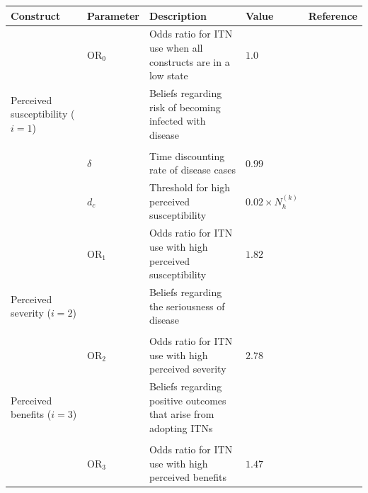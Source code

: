 \begin{table}[htp!]
    \centering
    \footnotesize
    \begin{adjustbox}{center}
        \begin{tabular}{m{3cm} >{\centering\arraybackslash}m{2cm} m{6cm} >{\centering\arraybackslash}m{2cm} m{3cm}} \toprule
        
        Construct & \centering Parameter & Description & \centering Value & Reference \\ \midrule
        & \centering $\text{OR}_0$ & Odds ratio for ITN use when all constructs are in a low state & \centering $1.0$ &  \\ \midrule
        
        Perceived susceptibility ($i=1$) 
        &  & Beliefs regarding risk of becoming infected with disease &  & \citet{champion_health_2015} \\
        & & & & \\
        & \centering $\delta$ & Time discounting rate of disease cases & \centering $0.99$ &  \\
        & \centering $d_c$ & Threshold for high perceived susceptibility & \centering $0.02\times N_h^{(k)}$ & \citet{durham_incorporating_2012} \\
        & \centering $\text{OR}_1$ & Odds ratio for ITN use with high perceived susceptibility & \centering $1.82$ & \citet{mensah_individual_2020} \\ \midrule
        
        Perceived severity ($i=2$) 
        &  & Beliefs regarding the seriousness of disease &  & \citet{champion_health_2015} \\
        & & & & \\
        & \centering $\text{OR}_2$ & Odds ratio for ITN use with high perceived severity & \centering $2.78$ & \citet{kakaire_role_2023} \\ \midrule
        
        Perceived benefits ($i=3$) 
        &  & Beliefs regarding positive outcomes that arise from adopting ITNs &  & \citet{champion_health_2015} \\
        & & & & \\
        & \centering $\text{OR}_3$ & Odds ratio for ITN use with high perceived benefits & \centering $1.47$ & \citet{babalola_factors_2018} \\ \midrule
        

\end{tabular}
\end{adjustbox}
\end{table}
